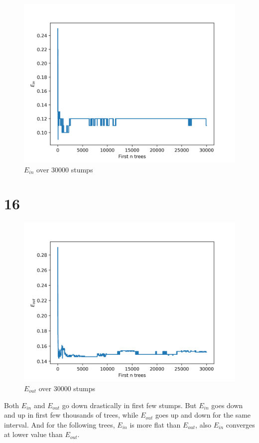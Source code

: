 \documentclass[fleqn,a4paper,12pt]{article}
\begin{document}
\begin{figure}[H]
\centering
\includegraphics[width=0.75\linewidth]{stump-ein.png}
\caption{$E_{in}$ over 30000 stumps}
\label{fig:stump-ein}
\end{figure}

\section*{16}

\begin{figure}[H]
\centering
\includegraphics[width=0.75\linewidth]{stump-eout.png}
\caption{$E_{out}$ over 30000 stumps}
\label{fig:stump-eout}
\end{figure}

Both $E_{in}$ and $E_{out}$ go down drastically in first few stumps. But $E_{in}$ goes down and up in first few thousands of trees, while $E_{out}$ goes up and down for the same interval. And for the following trees, $E_{in}$ is more flat than $E_{out}$, also $E_{in}$ converges at lower value than $E_{out}$.
\end{document}
